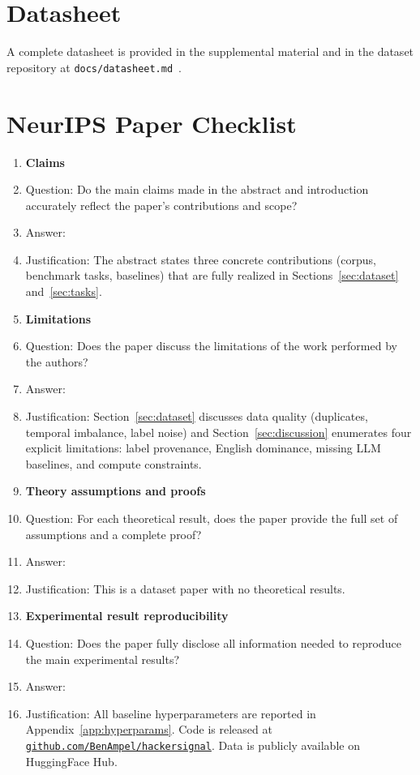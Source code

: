 \documentclass{article}
\begin{document}
\section{Datasheet}
\label{app:datasheet}

A complete datasheet is provided in the supplemental material and in the dataset repository at \texttt{docs/datasheet.md}~\citep{gebru2021datasheet}.

\newpage
\section*{NeurIPS Paper Checklist}

\begin{enumerate}

\item {\bf Claims}
    \item[] Question: Do the main claims made in the abstract and introduction accurately reflect the paper's contributions and scope?
    \item[] Answer: \answerYes{}
    \item[] Justification: The abstract states three concrete contributions (corpus, benchmark tasks, baselines) that are fully realized in Sections~\ref{sec:dataset} and~\ref{sec:tasks}.

\item {\bf Limitations}
    \item[] Question: Does the paper discuss the limitations of the work performed by the authors?
    \item[] Answer: \answerYes{}
\item[] Justification: Section~\ref{sec:dataset} discusses data quality (duplicates, temporal imbalance, label noise) and Section~\ref{sec:discussion} enumerates four explicit limitations: label provenance, English dominance, missing LLM baselines, and compute constraints.

\item {\bf Theory assumptions and proofs}
    \item[] Question: For each theoretical result, does the paper provide the full set of assumptions and a complete proof?
    \item[] Answer: \answerNA{}
    \item[] Justification: This is a dataset paper with no theoretical results.

\item {\bf Experimental result reproducibility}
    \item[] Question: Does the paper fully disclose all information needed to reproduce the main experimental results?
    \item[] Answer: \answerYes{}
    \item[] Justification: All baseline hyperparameters are reported in Appendix~\ref{app:hyperparams}. Code is released at \href{https://github.com/BenAmpel/hackersignal}{\texttt{github.com/BenAmpel/hackersignal}}. Data is publicly available on HuggingFace Hub.


\end{enumerate}
\end{document}
